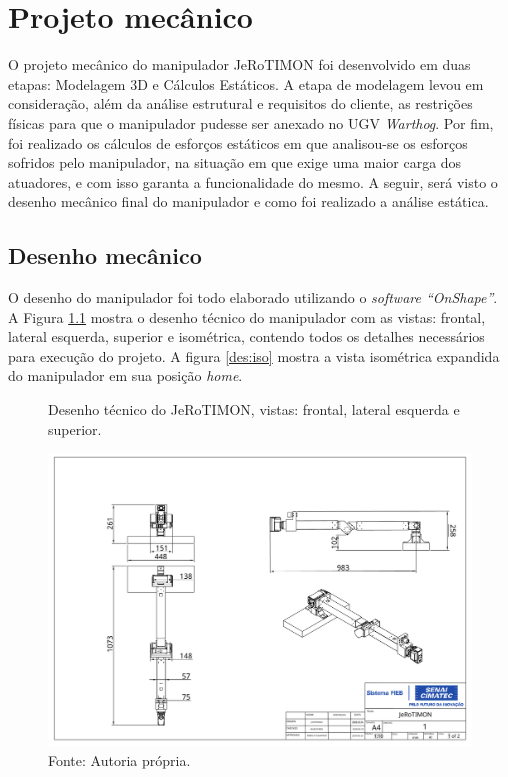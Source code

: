 \documentclass[
12pt,					%
openright,				%
twoside,				%
a4paper,				%
english,
brazil
]{ABNT/abntex2_report}
\begin{document}
	\chapter{Projeto mecânico}
	\label{apend:proj_mec}
	
	O projeto mecânico do manipulador JeRoTIMON foi desenvolvido em duas etapas: Modelagem 3D e Cálculos Estáticos. A etapa de modelagem levou em consideração, além da análise estrutural e requisitos do cliente, as restrições físicas para que o manipulador pudesse ser anexado no UGV \textit{Warthog}. Por fim, foi realizado os cálculos de esforços estáticos em que analisou-se os esforços sofridos pelo manipulador, na situação em que exige uma maior carga dos atuadores, e com isso garanta a funcionalidade do mesmo. A seguir, será visto o desenho mecânico final do manipulador e como foi realizado a análise estática.

	\section{Desenho mecânico}
	O desenho do manipulador foi todo elaborado utilizando o \textit{software ``OnShape''}. A Figura \ref{des:3_vis} mostra o desenho técnico do manipulador com as vistas: frontal, lateral esquerda, superior e isométrica, contendo todos os detalhes necessários para execução do projeto. A figura \ref{des:iso} mostra a vista isométrica expandida do manipulador em sua posição \textit{home}.

	\begin{figure}[H]
		\centering
		\caption{Desenho técnico do JeRoTIMON, vistas: frontal, lateral esquerda e superior.}
		\includegraphics[scale=.55, angle=90]{appendix/3_vistas.png}
		\caption*{Fonte: Autoria própria.}
		\label{des:3_vis}
	\end{figure}
\end{document}
